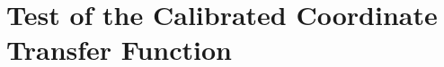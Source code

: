 \documentclass[a4paper]{article}\linespread{1.4}
\begin{document}

\clearpage
\section{Test of the Calibrated Coordinate Transfer Function}	 
\label{chap:measurements}
\end{document}
